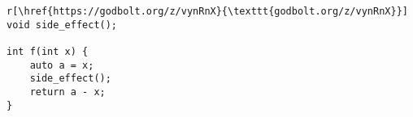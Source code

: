 \begin{lstlisting}r[\href{https://godbolt.org/z/vynRnX}{\texttt{godbolt.org/z/vynRnX}}]
void side_effect();

int f(int x) {
    auto a = x;
    side_effect();
    return a - x;
}
\end{lstlisting}\n